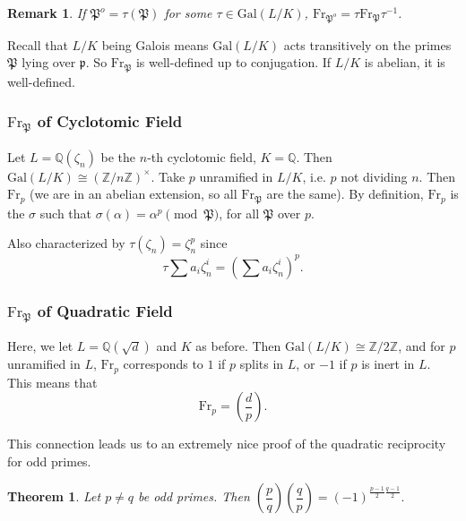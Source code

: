 \documentclass[letterpaper, 12pt]{article}
\newtheorem{rmk}{Remark}
\newtheorem{thm}{Theorem}[subsection]
\newcommand{\gal}[3]{\mathrm{Gal}(#1 #2 #3)}
\newcommand{\iso}{\cong}
\newcommand{\rats}{\mathbb{Q}}
\renewcommand{\prime}{\mathfrak{p}}
\newcommand{\oprime}{\mathfrak{P}}
\newcommand{\oprimealt}{\oprime^o}
\newcommand{\frob}[1]{\mathrm{Fr}_{#1}}
\newcommand{\legndr}[2]{\left(\dfrac{#1}{#2}\right)}
\newcommand{\Zmod}[1]{\mathbb{Z}/#1 \mathbb{Z}}
\newcommand{\Znu}{\left(\mathbb{Z}/n\mathbb{Z}\right)^\times}
\begin{document}
\begin{rmk}

If $\oprimealt = \tau(\oprime)$ for some $\tau \in \gal L/K$, $\frob
\oprimealt = \tau \frob \oprime \tau^{-1}$.

\end{rmk}

Recall that $L/K$ being Galois means $\gal L/K$ acts transitively on the
primes $\oprime$ lying over $\prime$. So $\frob \oprime$ is well-defined up to
conjugation. If $L/K$ is abelian, it is well-defined.

\subsubsection{$\frob \oprime$ of Cyclotomic Field}

Let $L = \rats(\zeta_n)$ be the $n$-th cyclotomic field, $K = \rats$. Then
$\gal L/K \iso \Znu$. Take $p$ unramified in $L/K$, i.e. $p$ not dividing $n$.
Then $\frob p$ (we are in an abelian extension, so all $\frob \oprime$ are the
same). By definition, $\frob p$ is the $\sigma$ such that $\sigma(\alpha) =
\alpha^p \pmod \oprime$, for all $\oprime$ over $p$.

Also characterized by $\tau(\zeta_n) = \zeta_n^p$ since \[\tau \sum a_i
\zeta_n^i = (\sum a_i \zeta_n^i)^p.\]

\subsubsection{$\frob \oprime$ of Quadratic Field}

Here, we let $L = \rats(\sqrt{d})$ and $K$ as before. Then $\gal L/K \iso \Zmod
2$, and for $p$ unramified in $L$, $\frob p$ corresponds to $1$ if $p$ splits
in $L$, or $-1$ if $p$ is inert in $L$. This means that \[\frob p = \legndr d
p.\]

This connection leads us to an extremely nice proof of the quadratic reciprocity
for odd primes.

\begin{thm}
Let $p \neq q$ be odd primes. Then $\legndr p q \legndr q p = (-1)^{\frac{p -
1}{2} \frac{q - 1}{2}}.$
\end{thm}
\end{document}

